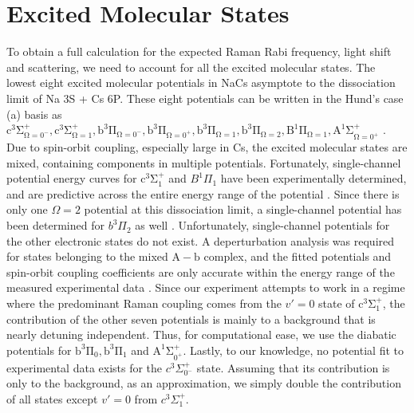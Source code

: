 \documentclass[aps,prx,secnumarabic,amsmath,amssymb,10pt,superscriptaddress]{revtex4-2}
\begin{document}
\section{Excited Molecular States} \label{sm:excited_states}
To obtain a full calculation for the expected Raman Rabi frequency, light shift and scattering, we need to account for all the excited molecular states.
The lowest eight excited molecular potentials in NaCs asymptote to the dissociation limit of Na 3S + Cs 6P.
These eight potentials can be written in the Hund's case (a) basis as $ \mathrm{c^3\Sigma^+_{\Omega = 0^-},c^3\Sigma^+_{\Omega = 1}, b^3\Pi_{\Omega = 0^-}, b^3\Pi_{\Omega = 0^+}, b^3\Pi_{\Omega = 1}, b^3\Pi_{\Omega = 2}, B^1\Pi_{\Omega = 1}, A^1\Sigma^+_{\Omega = 0^+}}$ \cite{Korek2007}.
Due to spin-orbit coupling, especially large in Cs, the excited molecular states are mixed, containing components in multiple potentials.
Fortunately, single-channel potential energy curves for $\mathrm{c^3\Sigma^+_1}$ and $  B^1\Pi_1 $ have been experimentally determined, and are predictive across the entire energy range of the potential \cite{Grochola2010, Grochola2011, Liu2017}.
Since there is only one $ \Omega = 2$ potential at this dissociation limit, a single-channel potential has been determined for $ b^3\Pi_2$ as well \cite{Zabawa2012}.
Unfortunately, single-channel potentials for the other electronic states do not exist.
A deperturbation analysis was required for states belonging to the mixed $\mathrm{A-b}$ complex,
and the fitted potentials and spin-orbit coupling coefficients are only accurate within the energy range of the measured experimental data \cite{Zaharova2009}.
Since our experiment attempts to work in a regime where the predominant Raman coupling comes from the $v' = 0$ state of $ \mathrm{c^3\Sigma^+_1} $,
the contribution of the other seven potentials is mainly to a background that is nearly detuning independent.
Thus, for computational ease, we use the diabatic potentials for $ \mathrm{b^3\Pi_{0}, b^3\Pi_{1}} $ and $ \mathrm{A^1\Sigma^+_{0^+}}$.
Lastly, to our knowledge, no potential fit to experimental data exists for the $ c^3\Sigma^+_{0^-}$ state. Assuming that its contribution is only to the background, as an approximation, we simply double the contribution of all states except $v' = 0$ from $ c^3\Sigma^+_1$.
\end{document}
